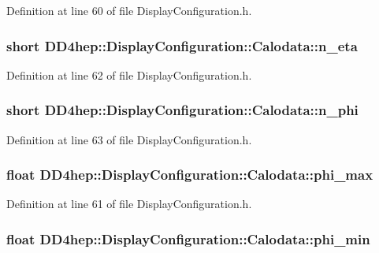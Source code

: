 Definition at line 60 of file DisplayConfiguration.h.\hypertarget{struct_d_d4hep_1_1_display_configuration_1_1_calodata_a0f4545d6efc01e1496fafdd925a4bdcd}{
\subsubsection[{n\_\-eta}]{\setlength{\rightskip}{0pt plus 5cm}short {\bf DD4hep::DisplayConfiguration::Calodata::n\_\-eta}}}
\label{struct_d_d4hep_1_1_display_configuration_1_1_calodata_a0f4545d6efc01e1496fafdd925a4bdcd}


Definition at line 62 of file DisplayConfiguration.h.\hypertarget{struct_d_d4hep_1_1_display_configuration_1_1_calodata_a30fd6c2e98b91f76c020d803c0cf10fd}{
\subsubsection[{n\_\-phi}]{\setlength{\rightskip}{0pt plus 5cm}short {\bf DD4hep::DisplayConfiguration::Calodata::n\_\-phi}}}
\label{struct_d_d4hep_1_1_display_configuration_1_1_calodata_a30fd6c2e98b91f76c020d803c0cf10fd}


Definition at line 63 of file DisplayConfiguration.h.\hypertarget{struct_d_d4hep_1_1_display_configuration_1_1_calodata_ae0666a2af1e429c873b335c99545ad21}{
\subsubsection[{phi\_\-max}]{\setlength{\rightskip}{0pt plus 5cm}float {\bf DD4hep::DisplayConfiguration::Calodata::phi\_\-max}}}
\label{struct_d_d4hep_1_1_display_configuration_1_1_calodata_ae0666a2af1e429c873b335c99545ad21}


Definition at line 61 of file DisplayConfiguration.h.\hypertarget{struct_d_d4hep_1_1_display_configuration_1_1_calodata_ab35d557de81c5fe8dbfecefda9e83cfb}{
\subsubsection[{phi\_\-min}]{\setlength{\rightskip}{0pt plus 5cm}float {\bf DD4hep::DisplayConfiguration::Calodata::phi\_\-min}}}
\label{struct_d_d4hep_1_1_display_configuration_1_1_calodata_ab35d557de81c5fe8dbfecefda9e83cfb}


